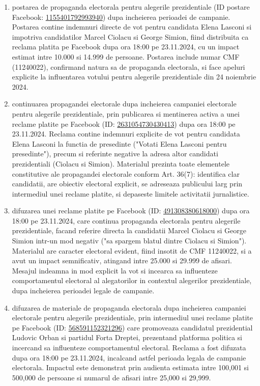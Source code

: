 \documentclass[a4paper,12pt]{article}
\begin{document}
\begin{enumerate}[leftmargin=*, label=\arabic*.)]
    \item postarea de propaganda electorala pentru alegerile prezidentiale (ID postare Facebook: \href{https://www.facebook.com/ads/library/?id=1155401792993940}{1155401792993940}) dupa incheierea perioadei de campanie. Postarea contine indemnuri directe de vot pentru candidata Elena Lasconi si impotriva candidatilor Marcel Ciolacu si George Simion, fiind distribuita ca reclama platita pe Facebook dupa ora 18:00 pe 23.11.2024, cu un impact estimat intre 10.000 si 14.999 de persoane. Postarea include numar CMF (11240022), confirmand natura sa de propaganda electorala, si face apeluri explicite la influentarea votului pentru alegerile prezidentiale din 24 noiembrie 2024.
    \item continuarea propagandei electorale dupa incheierea campaniei electorale pentru alegerile prezidentiale, prin publicarea si mentinerea activa a unei reclame platite pe Facebook (ID: \href{https://www.facebook.com/ads/library/?id=2631054730430413}{2631054730430413}) dupa ora 18:00 pe 23.11.2024. Reclama contine indemnuri explicite de vot pentru candidata Elena Lasconi la functia de presedinte ("Votati Elena Lasconi pentru presedinte"), precum si referinte negative la adresa altor candidati prezidentiali (Ciolacu si Simion). Materialul prezinta toate elementele constitutive ale propagandei electorale conform Art. 36(7): identifica clar candidatii, are obiectiv electoral explicit, se adreseaza publicului larg prin intermediul unei reclame platite, si depaseste limitele activitatii jurnalistice.
    \item difuzarea unei reclame platite pe Facebook (ID: \href{https://www.facebook.com/ads/library/?id=491308380618000}{491308380618000}) dupa ora 18:00 pe 23.11.2024, care continua propaganda electorala pentru alegerile prezidentiale, facand referire directa la candidatii Marcel Ciolacu si George Simion intr-un mod negativ ("sa spargem blatul dintre Ciolacu si Simion"). Materialul are caracter electoral evident, fiind insotit de CMF 11240022, si a avut un impact semnificativ, atingand intre 25.000 si 29.999 de afisari. Mesajul indeamna in mod explicit la vot si incearca sa influenteze comportamentul electoral al alegatorilor in contextul alegerilor prezidentiale, dupa incheierea perioadei legale de campanie.
    \item difuzarea de materiale de propaganda electorala dupa incheierea campaniei electorale pentru alegerile prezidentiale, prin intermediul unei reclame platite pe Facebook (ID: \href{https://www.facebook.com/ads/library/?id=568591152321296}{568591152321296}) care promoveaza candidatul prezidential Ludovic Orban si partidul Forta Dreptei, prezentand platforma politica si incercand sa influenteze comportamentul electoral. Reclama a fost difuzata dupa ora 18:00 pe 23.11.2024, incalcand astfel perioada legala de campanie electorala. Impactul este demonstrat prin audienta estimata intre 100,001 si 500,000 de persoane si numarul de afisari intre 25,000 si 29,999.
\end{enumerate}
\end{document}
